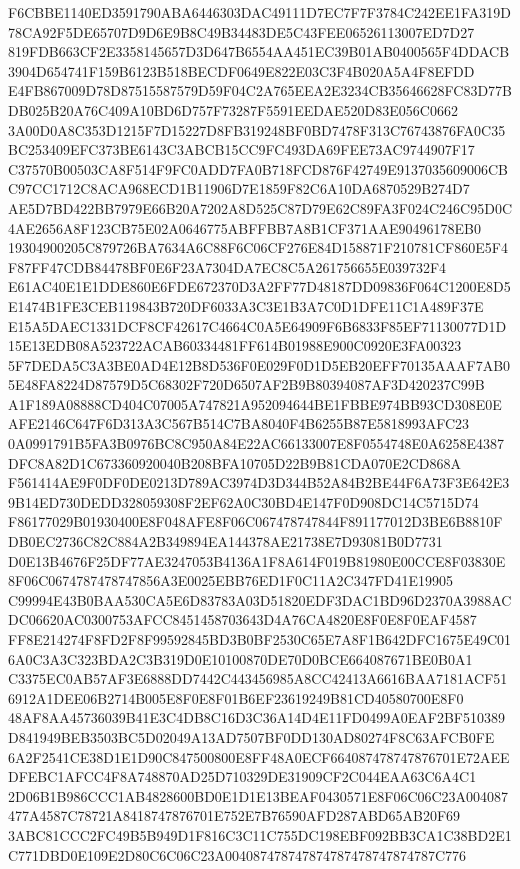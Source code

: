 \documentclass[UTF8,fontset=fandol,zihao=-4,a4paper]{ctexart}
\begin{document}
{{F6CBBE1140ED3591790ABA6446303DAC49111D7EC7F7F3784C242EE1FA319D78CA92F5DE65707D9D6E9B8C49B34483DE5C43FEE06526113007ED7D27
819FDB663CF2E3358145657D3D647B6554AA451EC39B01AB0400565F4DDACB3904D654741F159B6123B518BECDF0649E822E03C3F4B020A5A4F8EFDD
E4FB867009D78D87515587579D59F04C2A765EEA2E3234CB35646628FC83D77BDB025B20A76C409A10BD6D757F73287F5591EEDAE520D83E056C0662
3A00D0A8C353D1215F7D15227D8FB319248BF0BD7478F313C76743876FA0C35BC253409EFC373BE6143C3ABCB15CC9FC493DA69FEE73AC9744907F17
C37570B00503CA8F514F9FC0ADD7FA0B718FCD876F42749E9137035609006CBC97CC1712C8ACA968ECD1B11906D7E1859F82C6A10DA6870529B274D7
AE5D7BD422BB7979E66B20A7202A8D525C87D79E62C89FA3F024C246C95D0C4AE2656A8F123CB75E02A0646775ABFFBB7A8B1CF371AAE90496178EB0
19304900205C879726BA7634A6C88F6C06CF276E84D158871F210781CF860E5F4F87FF47CDB84478BF0E6F23A7304DA7EC8C5A261756655E039732F4
E61AC40E1E1DDE860E6FDE672370D3A2FF77D48187DD09836F064C1200E8D5E1474B1FE3CEB119843B720DF6033A3C3E1B3A7C0D1DFE11C1A489F37E
E15A5DAEC1331DCF8CF42617C4664C0A5E64909F6B6833F85EF71130077D1D15E13EDB08A523722ACAB60334481FF614B01988E900C0920E3FA00323
5F7DEDA5C3A3BE0AD4E12B8D536F0E029F0D1D5EB20EFF70135AAAF7AB05E48FA8224D87579D5C68302F720D6507AF2B9B80394087AF3D420237C99B
A1F189A08888CD404C07005A747821A952094644BE1FBBE974BB93CD308E0EAFE2146C647F6D313A3C567B514C7BA8040F4B6255B87E5818993AFC23
0A0991791B5FA3B0976BC8C950A84E22AC66133007E8F0554748E0A6258E4387DFC8A82D1C673360920040B208BFA10705D22B9B81CDA070E2CD868A
F561414AE9F0DF0DE0213D789AC3974D3D344B52A84B2BE44F6A73F3E642E39B14ED730DEDD328059308F2EF62A0C30BD4E147F0D908DC14C5715D74
F86177029B01930400E8F048AFE8F06C067478747844F891177012D3BE6B8810FDB0EC2736C82C884A2B349894EA144378AE21738E7D93081B0D7731
D0E13B4676F25DF77AE3247053B4136A1F8A614F019B81980E00CCE8F03830E8F06C0674787478747856A3E0025EBB76ED1F0C11A2C347FD41E19905
C99994E43B0BAA530CA5E6D83783A03D51820EDF3DAC1BD96D2370A3988ACDC06620AC0300753AFCC8451458703643D4A76CA4820E8F0E8F0EAF4587
FF8E214274F8FD2F8F99592845BD3B0BF2530C65E7A8F1B642DFC1675E49C016A0C3A3C323BDA2C3B319D0E10100870DE70D0BCE664087671BE0B0A1
C3375EC0AB57AF3E6888DD7442C443456985A8CC42413A6616BAA7181ACF516912A1DEE06B2714B005E8F0E8F01B6EF23619249B81CD40580700E8F0
48AF8AA45736039B41E3C4DB8C16D3C36A14D4E11FD0499A0EAF2BF510389D841949BEB3503BC5D02049A13AD7507BF0DD130AD80274F8C63AFCB0FE
6A2F2541CE38D1E1D90C847500800E8FF48A0ECF664087478747876701E72AEEDFEBC1AFCC4F8A748870AD25D710329DE31909CF2C044EAA63C6A4C1
2D06B1B986CCC1AB4828600BD0E1D1E13BEAF0430571E8F06C06C23A004087477A4587C78721A8418747876701E752E7B76590AFD287ABD65AB20F69
3ABC81CCC2FC49B5B949D1F816C3C11C755DC198EBF092BB3CA1C38BD2E1C771DBD0E109E2D80C6C06C23A004087478747874787478747874787C776
}}
\end{document}

